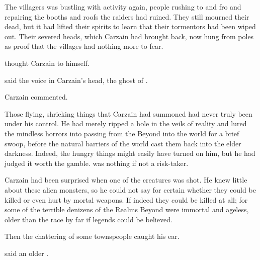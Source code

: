 \begin{comment}
  \section{Return to the village}
\end{comment}
The villagers was bustling with activity again, people rushing to and fro and repairing the booths and roofs the raiders had ruined. 
They still mourned their dead, but it had lifted their spirits to learn that their tormentors had been wiped out. 
Their severed heads, which Carzain had brought back, now hung from poles as proof that the villages had nothing more to fear. 

 thought Carzain to himself.

 said the voice in Carzain's head, the ghost of \VizicarDurasRespina.

 Carzain commented. 

Those flying, shrieking things that Carzain had summoned had never truly been under his control. 
He had merely ripped a hole in the veils of reality and lured the mindless horrors into passing from the Beyond into the world for a brief swoop, before the natural barriers of the world cast them back into the elder darkness. 
Indeed, the hungry things might easily have turned on him, but he had judged it worth the gamble. 
\CarzainShireyo was nothing if not a risk-taker. 

Carzain had been surprised when one of the creatures was shot. 
He knew little about these alien monsters, so he could not say for certain whether they could be killed or even hurt by mortal weapons. 
If indeed they could be killed at all; for some of the terrible denizens of the Realms Beyond were immortal and ageless, older than the \human race by far if legends could be believed. 

Then the chattering of some townspeople caught his ear. 

 said an older \sphyle.

